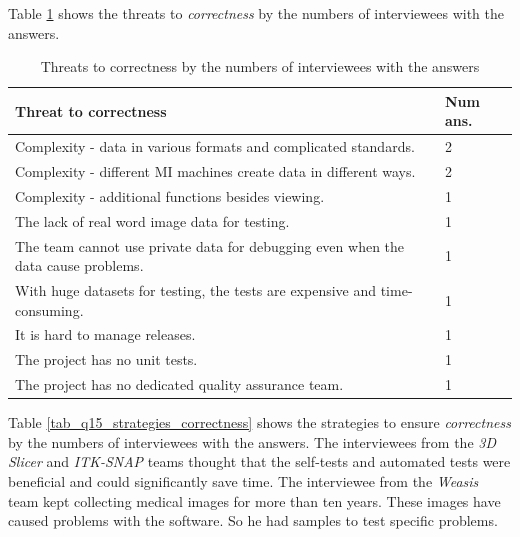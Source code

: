 \documentclass[3p, 12pt,authoryear]{elsarticle}
\begin{document}
Table \ref{tab_q15_threats_correctness} shows the threats to
\textit{correctness} by the numbers of interviewees with the answers.

\begin{table}[ht]
\centering
\hspace*{-1cm}\begin{tabular}{ll}
\hline
Threat to correctness & Num ans. \\ \hline
Complexity - data in various formats and complicated standards. & 2 \\
Complexity - different MI machines create data in different ways. & 2 \\
Complexity - additional functions besides viewing. & 1 \\
The lack of real word image data for testing. & 1 \\
The team cannot use private data for debugging even when the data cause
problems. & 1 \\
With huge datasets for testing, the tests are expensive and time-consuming. & 1 \\
It is hard to manage releases. & 1 \\
The project has no unit tests. & 1 \\
The project has no dedicated quality assurance team. & 1 \\ \hline
\end{tabular}
\caption{\label{tab_q15_threats_correctness}Threats to correctness by the
numbers of interviewees with the answers}
\end{table}

Table \ref{tab_q15_strategies_correctness} shows the strategies to ensure
\textit{correctness} by the numbers of interviewees with the answers. The
interviewees from the \textit{3D Slicer} and \textit{ITK-SNAP} teams thought
that the self-tests and automated tests were beneficial and could significantly
save time. The interviewee from the \textit{Weasis} team kept collecting medical
images for more than ten years. These images have caused problems with the
software. So he had samples to test specific problems.
\end{document}

